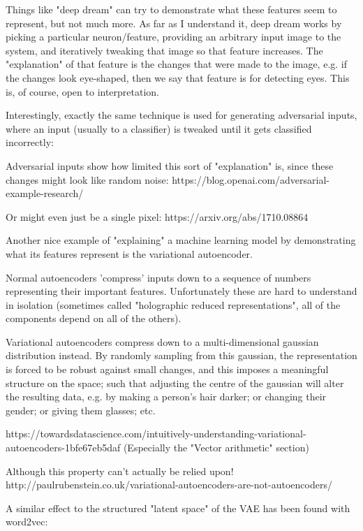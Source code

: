 \documentclass{article}
\begin{document}
Things like "deep dream" can try to demonstrate what these features
seem to represent, but not much more. As far as I understand it, deep
dream works by picking a particular neuron/feature, providing an
arbitrary input image to the system, and iteratively tweaking that image
so that feature increases. The "explanation" of that feature is the
changes that were made to the image, e.g. if the changes look
eye-shaped, then we say that feature is for detecting eyes. This is, of
course, open to interpretation.

Interestingly, exactly the same technique is used for generating
adversarial inputs, where an input (usually to a classifier) is tweaked
until it gets classified incorrectly:


Adversarial inputs show how limited this sort of "explanation" is, since
these changes might look like random noise:
https://blog.openai.com/adversarial-example-research/

Or might even just be a single pixel:
https://arxiv.org/abs/1710.08864

Another nice example of "explaining" a machine learning model by
demonstrating what its features represent is the variational
autoencoder.

Normal autoencoders 'compress' inputs down to a sequence of numbers
representing their important features. Unfortunately these are hard to
understand in isolation (sometimes called "holographic reduced
representations", all of the components depend on all of the others).

Variational autoencoders compress down to a multi-dimensional gaussian
distribution instead. By randomly sampling from this gaussian, the
representation is forced to be robust against small changes, and this
imposes a meaningful structure on the space; such that adjusting the
centre of the gaussian will alter the resulting data, e.g. by making a
person's hair darker; or changing their gender; or giving them glasses;
etc.

https://towardsdatascience.com/intuitively-understanding-variational-autoencoders-1bfe67eb5daf
(Especially the "Vector arithmetic" section)

Although this property can't actually be relied upon!
http://paulrubenstein.co.uk/variational-autoencoders-are-not-autoencoders/

A similar effect to the structured "latent space" of the VAE has been
found with word2vec:
\end{document}
